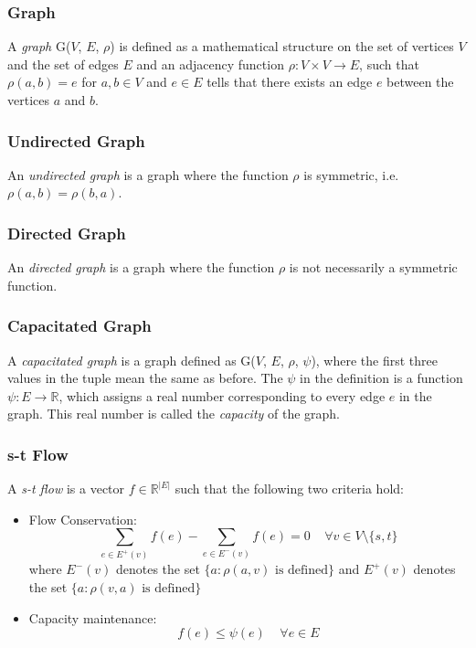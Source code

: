 \documentclass[BTech]{iitmdiss}
\begin{document}
      \subsubsection{Graph}
      A \textit{graph} G($V$, $E$, $\rho$) is defined as a mathematical structure on the set of vertices $V$ and the set of edges $E$ and an adjacency
      function $\rho : V \times V \rightarrow E$, such that $\rho(a,b) = e$ for $a,b \in V$ and $e \in E$ tells that there exists an edge $e$ between 
      the vertices $a$ and $b$.
      
      \subsubsection{Undirected Graph}
	An \textit{undirected graph} is a graph where the function $\rho$ is symmetric, i.e. $\rho(a,b) = \rho(b,a)$.
 
      \subsubsection{Directed Graph}
	An \textit{directed graph} is a graph where the function $\rho$ is not necessarily a symmetric function.
	
      \subsubsection{Capacitated Graph}
	A \textit{capacitated graph} is a graph defined as G($V$, $E$, $\rho$, $\psi$), where the first three values in the tuple mean the same as before.
	The $\psi$ in the definition is a function $\psi: E \rightarrow \mathbb{R}$, which assigns a real number corresponding to every edge $e$ in the 
	graph. This real number is called the \textit{capacity} of the graph.
      
      \subsubsection{s-t Flow}
	A \textit{s-t flow} is a vector $f \in \mathbb{R}^{|E|}$ such that the following two criteria hold:
	\begin{itemize}
	 \item 
	   Flow Conservation: $$\displaystyle\sum_{e \in E^+(v)} f(e)- \displaystyle\sum_{e \in E^-(v)} f(e) = 0 ~~~~~ \forall v \in V \setminus \{s,t\}$$
	   where $E^-(v)$ denotes the set $\{a: \rho(a,v) \text{ is defined}\}$ and $E^+(v)$ denotes the set $\{a: \rho(v,a) \text{ is defined}\}$
	 \item
	  Capacity maintenance:
	    $$f(e) \leq \psi(e)~~~~~\forall e \in E$$
	      
	\end{itemize}
	
\end{document}
